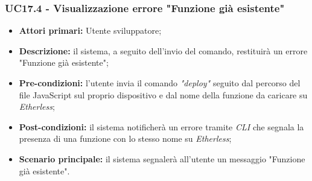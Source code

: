 \subsubsection{UC17.4 - Visualizzazione errore "Funzione già esistente"}
\begin{itemize}
	\item \textbf{Attori primari:} Utente sviluppatore;
	\item \textbf{Descrizione:} il sistema, a seguito dell'invio del comando, restituirà un errore "Funzione già esistente";
	\item \textbf{Pre-condizioni:}  l'utente invia il comando \textit{"deploy\glos"} seguito dal percorso del file JavaScript sul proprio dispositivo e dal nome della funzione da caricare su \textit{Etherless};
	\item \textbf{Post-condizioni:} il sistema notificherà un errore tramite \textit{CLI\glo} che segnala la presenza di una funzione con lo stesso nome su \textit{Etherless};
	\item \textbf{Scenario principale:} il sistema segnalerà all'utente un messaggio "Funzione già esistente".
\end{itemize}